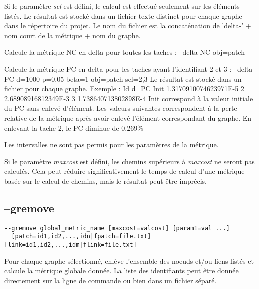 \documentclass[a4paper,10pt]{report}
\newenvironment{cmd}
{\quote\Verbatim}
{\endVerbatim\endquote}
\begin{document}
Si le paramètre \textit{sel} est défini, le calcul est effectué seulement sur les éléments listés.
Le résultat est stocké dans un fichier texte distinct pour chaque graphe dans le répertoire du projet.
Le nom du fichier est la concaténation de 'delta-' + nom court de la métrique + nom du graphe.

Calcule la métrique NC en delta pour toutes les taches :
\begin{cmd}
--delta NC obj=patch
\end{cmd}

Calcule la métrique PC en delta pour les taches ayant l'identifiant 2 et 3 :
\begin{cmd}
--delta PC d=1000 p=0.05 beta=1 obj=patch sel=2,3
\end{cmd}
Le résultat est stocké dans un fichier pour chaque graphe. Exemple :
\begin{cmd}
Id    d_PC
Init  1.3170910074623971E-5
2     2.68908916812349E-3
3     1.738640713802898E-4
\end{cmd}
Init correspond à la valeur initiale du PC sans enlevé d'élément.
Les valeurs suivantes correspondent à la perte relative de la métrique après avoir enlevé l'élément correspondant du graphe.
En enlevant la tache 2, le PC diminue de 0.269\%

Les intervalles ne sont pas permis pour les paramètres de la métrique.

Si le paramètre \textit{maxcost} est défini, les chemins supérieurs à \textit{maxcost} ne seront pas calculés. 
Cela peut réduire significativement le temps de calcul d'une métrique basée sur le calcul de chemins, mais le résultat peut être imprécis.


\subsection{--gremove}
\begin{verbatim}
--gremove global_metric_name [maxcost=valcost] [param1=val ...] 
  [patch=id1,id2,...,idn|fpatch=file.txt] [link=id1,id2,...,idm|flink=file.txt]
\end{verbatim}
Pour chaque graphe sélectionné, enlève l'ensemble des noeuds et/ou liens listés et calcule la métrique globale donnée.
La liste des identifiants peut être donnée directement sur la ligne de commande ou bien dans un fichier séparé.
\end{document}
